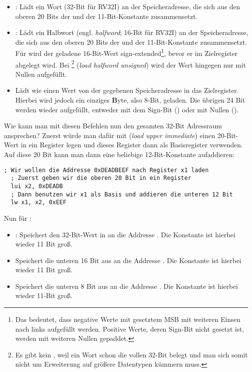 \begin{itemize}
  \item {}: Lädt ein Wort (32-Bit für RV32I) an der
    Speicheradresse, die sich aus den oberen 20 Bits der  und der
    11-Bit-Konstante  zusammensetzt.
  \item {}: Lädt ein Halbwort
    (engl. \emph{halfword}; 16-Bit für RV32I) an der Speicheradresse, die sich
    aus den oberen 20 Bits der  und der 11-Bit-Konstante
     zusammensetzt. Für  wird der geladene 16-Bit-Wert
    sign-extended\footnote{Das bedeutet, dass negative Werte mit gesetztem MSB
      mit weiteren Einsen nach links aufgefüllt werden. Positive Werte, deren
      Sign-Bit nicht gesetzt ist, werden mit weiteren Nullen gepaddet.}, bevor er im
    Zielregister abgelegt wird. Bei \footnote{Es gibt kein ,
      weil ein Wort schon die vollen 32-Bit belegt und man sich somit nicht um
      Erweiterung auf größere Datentypen kümmern muss.} (\emph{load halfword
      unsigned}) wird der Wert hingegen nur mit Nullen aufgefüllt.
  \item {} Lädt wie  einen Wert von
    der gegebenen Speicheradresse in das Zielregister. Hierbei wird jedoch ein
    einziges \textbf{B}yte, also 8-Bit, geladen. Die übrigen 24 Bit werden wieder
    aufgefüllt, entweder mit dem Sign-Bit () oder mit Nullen
    ().
\end{itemize}

Wie kann man mit diesen Befehlen nun den gesamten 32-Bit Adressraum ansprechen?
Zuerst würde man dafür mit  (\emph{load upper immediate}) einen 20-Bit-Wert
in ein Register legen und dieses Register dann als Basisregister
verwenden. Auf diese 20 Bit kann man dann eine beliebige 12-Bit-Konstante
aufaddieren:

\begin{lstlisting}[style=risc-v_Assembler]
  ; Wir wollen die Addresse 0xDEADBEEF nach Register x1 laden
  ; Zuerst geben wir die oberen 20 Bit in ein Register
  lui x2, 0xDEADB
  ; Dann benutzen wir x1 als Basis und addieren die unteren 12 Bit
  lw x1, x2, 0xEEF
\end{lstlisting}

Nun für :

\begin{itemize}
  \item {}: Speichert den 32-Bit-Wert in 
    an die Addresse . Die Konstante  ist
    hierbei wieder 11 Bit groß.
  \item {} Speichert die unteren 16 Bit aus  an die Addresse
    . Die Konstante  ist hierbei wieder
    11 Bit groß.
  \item {} Speichert die unteren 8 Bit aus  an die Addresse
    . Die Konstante  ist hierbei wieder
    11-Bit groß.
\end{itemize}

